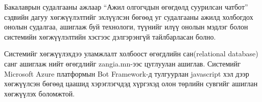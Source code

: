 
\quad Бакалаврын судалгааны ажлаар ``Ажил олгогчдын өгөгдөлд суурилсан чатбот'' сэдвийн дагуу хөгжүүлэлтийг эхлүүлсэн бөгөөд уг судалгааны ажилд холбогдох онолын судалгаа, ашиглаж буй технологи, түүнийг илүү онолын мэдлэг болон системийн хөгжүүлэлтийн хэсгээс дэлгэрэнгүй тайлбарласан болно.

Системийг хөгжүүлэхдээ уламжлалт холбоост өгөгдлийн сан(relational database) санг ашиглаж нийт өгөгдлийг zangia.mn-ээс цуглуулан ашиглав. Системийг Microsoft Azure платформын Bot Framework-д тулгуурлан javascript хэл дээр хөгжүүлсэн бөгөөд цаашид хэрэглэгчдэд хүргэхэд олон төрлийн сувгийг ашиглан хөгжүүлэх боломжтой.
